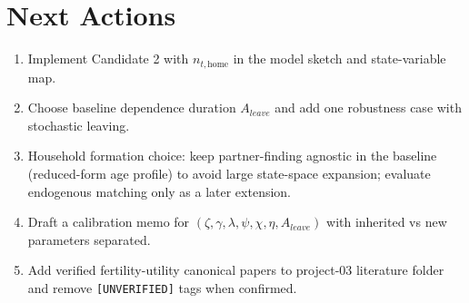 \documentclass[11pt]{article}
\begin{document}
\section{Next Actions}
\begin{enumerate}
\item Implement Candidate 2 with \(n_{t,\text{home}}\) in the model sketch and state-variable map.
\item Choose baseline dependence duration \(A_{leave}\) and add one robustness case with stochastic leaving.
\item Household formation choice: keep partner-finding agnostic in the baseline (reduced-form age profile) to avoid large state-space expansion; evaluate endogenous matching only as a later extension.
\item Draft a calibration memo for \((\zeta,\gamma,\lambda,\psi,\chi,\eta,A_{leave})\) with inherited vs new parameters separated.
\item Add verified fertility-utility canonical papers to project-03 literature folder and remove \texttt{[UNVERIFIED]} tags when confirmed.
\end{enumerate}
\end{document}
